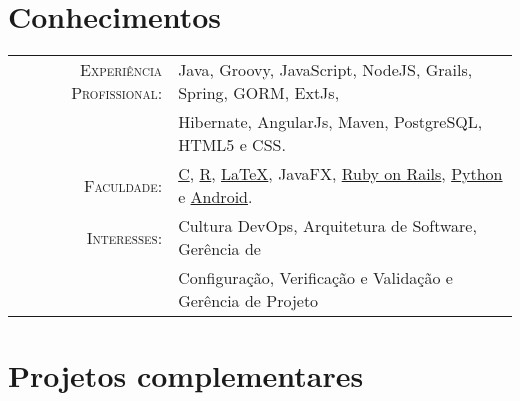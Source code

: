 \documentclass[a4paper,10pt]{article} %
\begin{document}
\section{Conhecimentos}

\begin{tabular}{rl}
	\textsc{Experiência Profissional:} &
	Java, Groovy, JavaScript, NodeJS, Grails, Spring, GORM, ExtJs, \\
	& Hibernate, AngularJs, Maven, PostgreSQL, HTML5 e CSS.\\

	\textsc{Faculdade:} &
	\href{https://bitbucket.org/Yuri-M-Dias/projeto-3/src}{C},
	\href{https://github.com/Yuri-M-Dias/meteorites}{R},
	\href{https://github.com/Yuri-M-Dias/curriculum}{\LaTeX},
	JavaFX, %
	\href{https://github.com/Yuri-M-Dias/LabWiki}{Ruby on Rails},
	\href{https://gist.github.com/Yuri-M-Dias/d7b69fd8bc873cdf6029af5dcb5a8a0f}{Python} e
	\href{https://github.com/Yuri-M-Dias/HealthHelp}{Android}.
	\\

	\textsc{Interesses:} & Cultura DevOps, Arquitetura de Software, Gerência de \\
	& Configuração, Verificação e Validação e Gerência de Projeto \\

\end{tabular}


\section{Projetos complementares}
\end{document}
